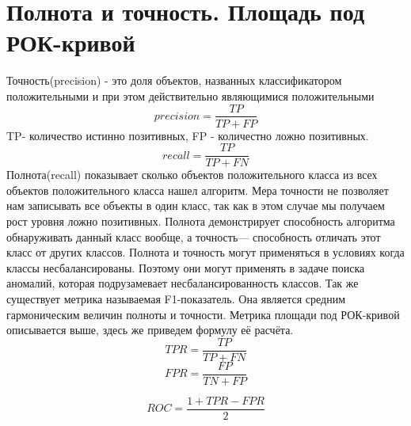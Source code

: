 \section{Полнота и точность. Площадь под РОК-кривой}
Точность(precision) - это доля объектов, названных классификатором положительными и при этом действительно являющимися положительными
	\begin{equation}
precision= \frac{TP}{TP+FP}
	\end{equation}
TP- количество истинно позитивных, FP - количестно ложно позитивных.
	\newline
	\begin{equation}
	recall= \frac{TP}{TP+FN}
	\end{equation}
	Полнота(recall) показывает сколько объектов положительного класса из всех объектов положительного класса нашел алгоритм.
	Мера точности не позволяет нам записывать все объекты в один класс, так как в этом случае мы получаем рост уровня ложно позитивных. Полнота демонстрирует способность алгоритма обнаруживать данный класс вообще, а точность— способность отличать этот класс от других классов. Полнота и точность могут применяться в условиях когда классы несбалансированы\cite{def06}. Поэтому они могут применять в задаче поиска аномалий, которая подрузамевает несбалансированность классов.
	Так же существует метрика называемая F1-показатель. Она является средним гармоническим величин полноты и точности.
	Метрика площади под РОК-кривой описывается выше, здесь же приведем формулу её расчёта.
	\begin{equation}
	TPR=\frac{TP}{TP+FN}
	\end{equation}
		\begin{equation}
	FPR=\frac{FP}{TN+FP}
		\end{equation}
		

		\begin{equation}
	ROC=\frac{1 + TPR - FPR}{2} 
		\end{equation}
	
